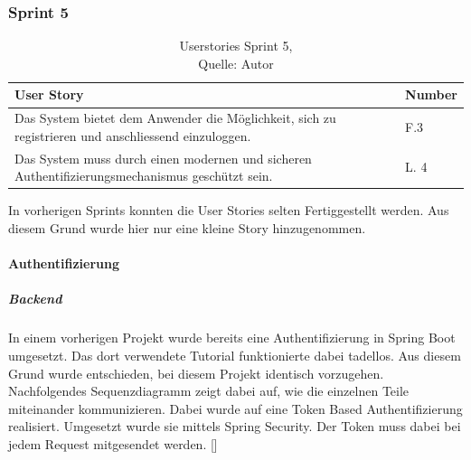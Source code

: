 \subsubsection{Sprint 5}
\begin{table}[H]
	\setlength\extrarowheight{2pt} %
	\begin{tabularx}{\textwidth}{|X|l|}
		\hline
		\textbf{User Story} & \textbf{Number} \\
		\hline
		Das System bietet dem Anwender die Möglichkeit, sich zu registrieren und anschliessend einzuloggen. & F.3\\
		\hline
		Das System muss durch einen modernen und sicheren Authentifizierungsmechanismus geschützt sein. & L. 4\\
		\hline
	\end{tabularx} 
	\caption[Userstories Sprint 5]{Userstories Sprint 5,\\ Quelle: Autor}
\end{table}\label{userStoriesSprint5}
 In vorherigen Sprints konnten die User Stories selten Fertiggestellt werden. Aus diesem Grund wurde hier nur eine kleine Story hinzugenommen.
 
\paragraph{Authentifizierung}
\subparagraph{Backend}
 In einem vorherigen Projekt wurde bereits eine Authentifizierung in Spring Boot umgesetzt. Das dort verwendete Tutorial funktionierte dabei tadellos. Aus diesem Grund wurde entschieden, bei diesem Projekt identisch vorzugehen. Nachfolgendes Sequenzdiagramm zeigt dabei auf, wie die einzelnen Teile miteinander kommunizieren. Dabei wurde auf eine Token Based Authentifizierung realisiert. Umgesetzt wurde sie mittels Spring Security. Der Token muss dabei bei jedem Request mitgesendet werden. [\cite{authAPISpring}]
  
